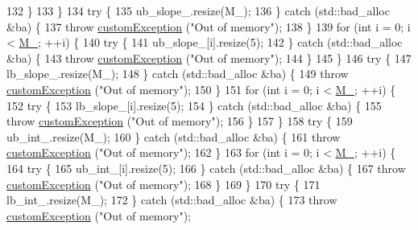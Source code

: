 \begin{DoxyCode}
132         \}
133     \}
134     \textcolor{keywordflow}{try} \{
135         ub\_slope\_.resize(M\_);
136     \} \textcolor{keywordflow}{catch} (std::bad\_alloc &ba) \{
137         \textcolor{keywordflow}{throw} \hyperlink{classcustom_exception}{customException} (\textcolor{stringliteral}{"Out of memory"});
138     \}
139     \textcolor{keywordflow}{for} (\textcolor{keywordtype}{int} i = 0; i < \hyperlink{classbarrier_a274cf283ffc97c22ffa9a4258369c400}{M\_}; ++i) \{
140         \textcolor{keywordflow}{try} \{
141             ub\_slope\_[i].resize(5);
142         \} \textcolor{keywordflow}{catch} (std::bad\_alloc &ba) \{
143             \textcolor{keywordflow}{throw} \hyperlink{classcustom_exception}{customException} (\textcolor{stringliteral}{"Out of memory"});
144         \}
145     \}
146     \textcolor{keywordflow}{try} \{
147         lb\_slope\_.resize(M\_);
148     \} \textcolor{keywordflow}{catch} (std::bad\_alloc &ba) \{
149         \textcolor{keywordflow}{throw} \hyperlink{classcustom_exception}{customException} (\textcolor{stringliteral}{"Out of memory"});
150     \}
151     \textcolor{keywordflow}{for} (\textcolor{keywordtype}{int} i = 0; i < \hyperlink{classbarrier_a274cf283ffc97c22ffa9a4258369c400}{M\_}; ++i) \{
152         \textcolor{keywordflow}{try} \{
153             lb\_slope\_[i].resize(5);
154         \} \textcolor{keywordflow}{catch} (std::bad\_alloc &ba) \{
155             \textcolor{keywordflow}{throw} \hyperlink{classcustom_exception}{customException} (\textcolor{stringliteral}{"Out of memory"});
156         \}
157     \}
158     \textcolor{keywordflow}{try} \{
159         ub\_int\_.resize(M\_);
160     \} \textcolor{keywordflow}{catch} (std::bad\_alloc &ba) \{
161         \textcolor{keywordflow}{throw} \hyperlink{classcustom_exception}{customException} (\textcolor{stringliteral}{"Out of memory"});
162     \}
163     \textcolor{keywordflow}{for} (\textcolor{keywordtype}{int} i = 0; i < \hyperlink{classbarrier_a274cf283ffc97c22ffa9a4258369c400}{M\_}; ++i) \{
164         \textcolor{keywordflow}{try} \{
165             ub\_int\_[i].resize(5);
166         \} \textcolor{keywordflow}{catch} (std::bad\_alloc &ba) \{
167             \textcolor{keywordflow}{throw} \hyperlink{classcustom_exception}{customException} (\textcolor{stringliteral}{"Out of memory"});
168         \}
169     \}
170     \textcolor{keywordflow}{try} \{
171         lb\_int\_.resize(M\_);
172     \} \textcolor{keywordflow}{catch} (std::bad\_alloc &ba) \{
173         \textcolor{keywordflow}{throw} \hyperlink{classcustom_exception}{customException} (\textcolor{stringliteral}{"Out of memory"});

\end{DoxyCode}
